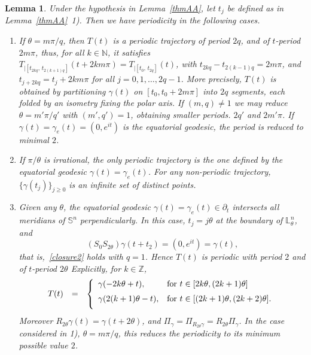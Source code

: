 \documentclass[11pt,a4paper,times]{amsart}
\theoremstyle{plain}
\newtheorem{lemma}[thm]{Lemma}
\theoremstyle{definition}
\numberwithin{equation}{section}
\newcommand{\eqskip}{ \vspace*{2mm}\\ }
\newcommand{\N}{\mathbb{N}}
\newcommand{\Z}{\mathbb{Z}}
\newcommand{\Se}{\mathbb{S}}
\newcommand{\lune}[2]{\mathbb{L}^{#1}_{#2}}
\begin{document}
\begin{lemma}\label{thmAB}
Under the hypothesis in Lemma~\ref{thmAA}, let $t_j$ be defined as in Lemma~\ref{thmAA}{\rm~1)}. Then we have periodicity in the following cases.
\begin{enumerate}[{\rm 1)}]
\item If $\theta=m\pi/q$, then $T(t)$ is a periodic trajectory of period $2q$, and of $t$-period $2m\pi$, thus,  for all $k\in \N$, it satisfies
$T_{|[t_{2kq},\, t_{2(k+1)q}]}(t+2km\pi)=T_{|[t_0,\,t_{2q}]}(t)$, 
with $t_{2kq}-t_{2(k-1)q}=2m\pi$, and $t_{j+2kq}= t_j +2km\pi$ for all $j=0,1,\ldots,2q-1$.
More precisely, $T(t)$ is obtained by partitioning 
$\gamma(t)$ on $[t_0,t_0+2m\pi]$ into $2q$ segments, each folded by an isometry fixing the polar axis.
 If $(m,q)\neq 1$ we may reduce 
$\theta=m'\pi/q'$ with $(m',q')=1$, obtaining smaller periods. $2q'$ and $2m'\pi$.
If $\gamma(t)=\gamma_e(t)=(0, e^{it})$ 
is the equatorial geodesic, the period is reduced to minimal $2$.\\[-3mm]

\item If $\pi/\theta$ is irrational, the only periodic trajectory is the one defined by the equatorial geodesic $\gamma(t)=\gamma_{e}(t)$.
For any non-periodic trajectory, $\{\gamma(t_j)\}_{j\ge0}$ is an infinite set of distinct points.\\[-3mm]

\item Given any $\theta$, the equatorial geodesic $\gamma(t)=\gamma_{e}(t)\in \partial_{t}$ intersects all meridians of $\Se^n$ perpendicularly.
In this case, $t_{j}=j\theta$ at the boundary of $\lune{n}{\theta}$, and
\[
(S_0S_{2\theta})\gamma(t+t_2)=(0,e^{it})=\gamma(t),
\]
that is,~\eqref{closure2} holds with $q=1$. Hence $T(t)$ is periodic with period $2$ and of $t$-period  $2\theta$
Explicitly, for $k\in \Z$,
\[
\begin{array}{llll}
T(t) & = & \left\{
\begin{array}{ll}
\gamma(-2k\theta+t), & \text{for } t\in [2k\theta, (2k+1)\theta] \eqskip
\gamma(2(k+1)\theta-t), & \text{for } t\in [(2k+1)\theta,(2k+2)\theta].\eqskip
\end{array}
\right.
\end{array}
\]
Moreover $R_{2\theta}\gamma(t)=\gamma(t+2\theta)$, and 
$\Pi_{\gamma}=\Pi_{R_{2\theta}\gamma}=R_{2\theta}\Pi_{\gamma}$.
In the case considered in {\rm 1)}, $\theta=m\pi/q$, this reduces the periodicity to its minimum possible value $2$.\\[-2mm]
\end{enumerate}
\end{lemma}
\end{document}
